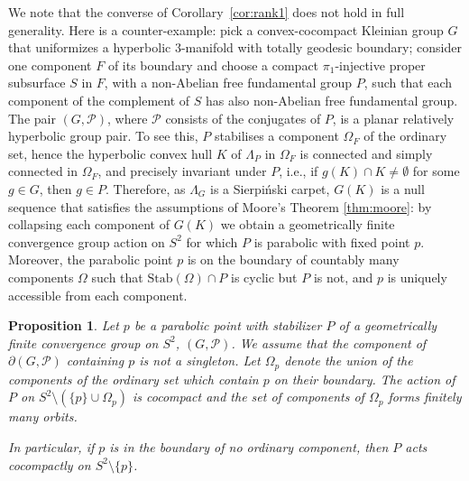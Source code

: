 \documentclass[11pt]{article}
\newtheorem{proposition}[theorem]{Proposition}
\theoremstyle{definition}
\newcommand\PP{\mathcal{P}}
\newcommand\Stab{\text{Stab}}
\begin{document}
We note that the converse of Corollary~\ref{cor:rank1} does not hold in full generality. 
Here is a counter-example: pick a convex-cocompact Kleinian group $G$ that uniformizes a hyperbolic 3-manifold with totally geodesic boundary; consider one component
$F$ of its boundary and choose a compact $\pi_1$-injective proper subsurface $S$ in $F$, with a non-Abelian free fundamental group $P$, such that each component of the complement of $S$ has also non-Abelian free fundamental group. The pair $(G,\mathcal{P})$, where $\mathcal{P}$ consists of the conjugates of $P$, is a planar relatively hyperbolic group pair.  
To see this, $P$ stabilises a component $\Omega_F$ of the ordinary set, hence the hyperbolic convex hull $K$ of $\Lambda_P$ in $\Omega_F$ is connected and simply connected in $\Omega_F$, and precisely invariant under $P$, i.e., if $g(K)\cap K\ne \emptyset$ for some $g\in G$, then $g\in P$. Therefore, as $\Lambda_G$ is a  Sierpi\'nski carpet, $G(K)$ is a null sequence that satisfies the assumptions of Moore's Theorem \ref{thm:moore}: by collapsing each component
of $G(K)$ we obtain a geometrically finite convergence group action on $S^2$ for which $P$ is parabolic with fixed point $p$. Moreover, the parabolic point $p$ is on the boundary of countably many components $\Omega$ such that $\Stab(\Omega)\cap P $
is cyclic but $P$ is not, and $p$ is uniquely accessible from each component. 

\begin{proposition}\label{prop:parabsubgp}  Let $p$ be a parabolic point with stabilizer $P$ of a geometrically finite convergence group on $S^2$, $(G,\PP)$. We assume that the component of $\partial(G, \PP)$ containing $p$ is not a singleton.
Let $\Omega_p$ denote the union of the 
components {of the ordinary set} which contain $p$ on their
boundary. The action of $P$ on $S^2\setminus (\{p\}\cup\Omega_p)$ is cocompact and
the set of components of $\Omega_p$ forms finitely many orbits.

In particular, if $p$ is in the boundary of no ordinary component, then $P$ acts cocompactly on $S^2\setminus\{p\}$.
\end{proposition}
\end{document}
